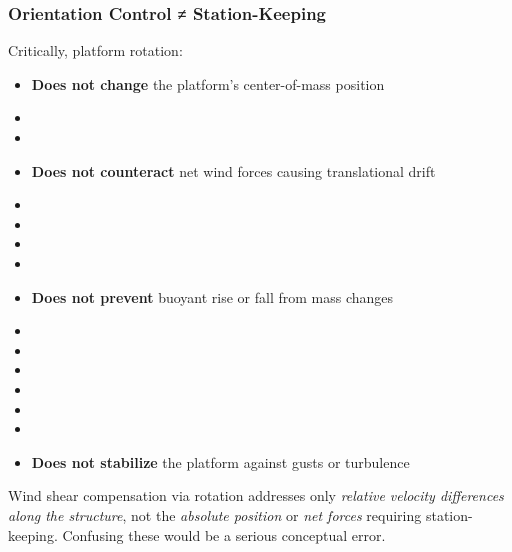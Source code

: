 {{{{\subsubsection{Orientation Control ≠ Station-Keeping}
Critically, platform rotation:
\begin{itemize}
    \item \textbf{Does not change} the platform's center-of-mass position
    \item \item \item \textbf{Does not counteract} net wind forces causing translational drift
    \item \item \item \item \item \textbf{Does not prevent} buoyant rise or fall from mass changes
    \item \item \item \item \item \item \item \textbf{Does not stabilize} the platform against gusts or turbulence
\end{itemize}
Wind shear compensation via rotation addresses only \emph{relative velocity differences along the structure}, not the \emph{absolute position} or \emph{net forces} requiring station-keeping. Confusing these would be a serious conceptual error.

}}}}
